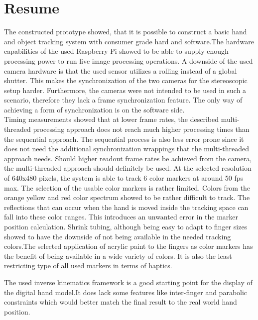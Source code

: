 \chapter{Resume}
The constructed prototype showed, that it is possible to construct a basic hand and object tracking system with consumer grade hard and software.The hardware capabilities of the used Raspberry Pi showed to be able to supply enough processing power to run live image processing operations. A downside of the used camera hardware is that the used sensor utilizes a rolling instead of a global shutter. This makes the synchronization of the two cameras for the stereoscopic setup harder. Furthermore, the cameras were not intended to be used in such a scenario, therefore they lack a frame synchronization feature. The only way of achieving a form of synchronization is on the software side.\\
Timing measurements showed that at lower frame rates, the described multi-threaded processing approach does not reach much higher processing times than the sequential approach. The sequential process is also less error prone since it does not need the additional synchronization wrappings that the multi-threaded approach needs. Should higher readout frame rates be achieved from the camera, the multi-threaded approach should definitely be used. At the selected resolution of 640x480 pixels, the system is able to track 6 color markers at around 50 fps max.
The selection of the usable color markers is rather limited. Colors from the orange yellow and red color spectrum showed to be rather difficult to track. The reflections that can occur when the hand is moved inside the tracking space can fall into these color ranges. This introduces an unwanted error in the marker position calculation.
Shrink tubing, although being easy to adapt to finger sizes showed to have the downside of not being available in the needed tracking colors.The selected application of acrylic paint to the fingers as color markers has the benefit of being available in a wide variety of colors. It is also the least restricting type of all used markers in terms of haptics.

The used inverse kinematics framework is  a good starting point for the display of the digital hand model.It does lack some features like inter-finger and parabolic constraints which would better match the final result to the real world hand position.

